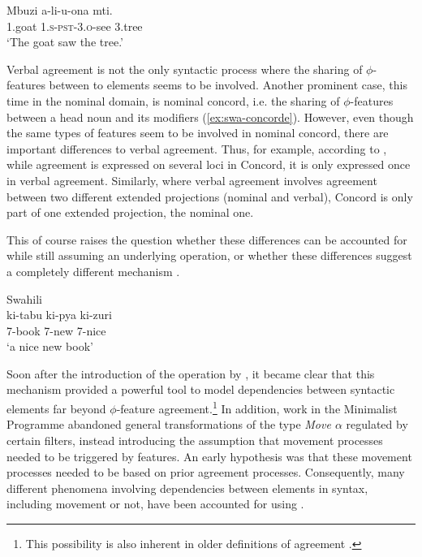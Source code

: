 \documentclass[output=paper
,modfonts
,nonflat]{langsci/langscibook}
\begin{document}
\begin{exe}
	\ex \label{ex:swa-subj-obj} 
	\gll Mbuzi a-li-u-ona mti.\\
	1.goat \textsc{1.s-pst-3.o}-see 3.tree\\
	\glt `The goat saw the tree.'
	
\end{exe}
Verbal agreement is not the only syntactic process where the sharing of $\phi$-features between to elements seems to be involved.
Another prominent case, this time in the nominal domain, is nominal concord, i.e. the sharing of $\phi$-features between a head noun and its modifiers (\ref{ex:swa-concorde}).
However, even though the same types of features seem to be involved in nominal concord, there are important differences to verbal agreement. Thus, for example, according to \citet[][7]{Norris2014}, while agreement is expressed on several loci in Concord, it is only expressed once in verbal agreement. Similarly, where verbal agreement involves agreement between two different extended projections (nominal and verbal), Concord is only part of one extended projection, the nominal one.

This of course raises the question whether these differences can be accounted for while still assuming an underlying \agr{} operation, or whether these differences suggest a completely different mechanism \citep{Norris2014}.
\begin{exe}
	\ex Swahili \label{ex:swa-concorde}\\
	\gll ki-tabu ki-pya ki-zuri\\
	7-book 7-new 7-nice\\
	\glt `a nice new book'
	
\end{exe}
Soon after the introduction of the {\agr} operation by \citet{Chomsky2000,Chomsky2001}, it became clear that this mechanism provided a powerful tool to model dependencies between syntactic elements far beyond $\phi$-feature agreement.\footnote{This possibility is also inherent in older definitions of agreement \citep{steel1978,kayne1989}.}
In addition, work in the Minimalist Programme abandoned general transformations of the type \textit{Move $\alpha$} regulated by certain filters, instead introducing the assumption that movement processes needed to be triggered by features.
An early hypothesis was that these  movement processes needed to be based on prior agreement processes.
Consequently, many different phenomena involving dependencies between elements in syntax, including movement or not, have been accounted for using \agr.
\end{document}
